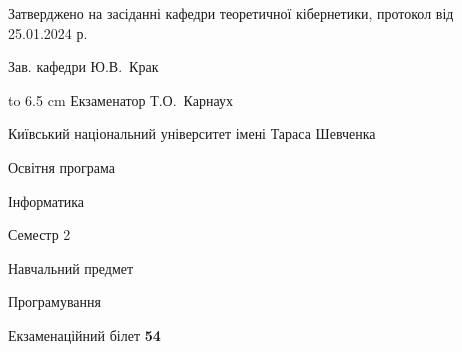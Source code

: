 \documentclass[12pt, ukrainian]{article}
\begin{document}
{\smallskip\smallskip \begin {scriptsize} Затверджено на засіданні кафедри теоретичної кібернетики, протокол   від   25.01.2024 р.\par\smallskip\smallskip\smallskip\smallskip
{\parbox {6.5 cm} {Зав. кафедри \dotfill Ю.В.~Крак}}\hspace {0.7cm} {\hbox to 6.5 cm { Екзаменатор \dotfill Т.О.~Карнаух}} \end{scriptsize}}
\newpage
{{\begin {scriptsize}\par
{ \center  Київський національний університет імені Тараса Шевченка \par}
{\parbox {5 cm}{Освітня програма \hfill}{\parbox {7 cm}{Інформатика\hfill}}\parbox {6 cm}{\hfill Семестр 2}}\par
{\parbox {5 cm} {Навчальний предмет \hfill}\parbox {7 cm}{Програмування \hfill}\parbox {6cm}{\hfill}\par}\vspace{-15pt} \end{scriptsize}}{\center Екзаменаційний білет \No \textbf { 54 }\par}}
\end{document}
